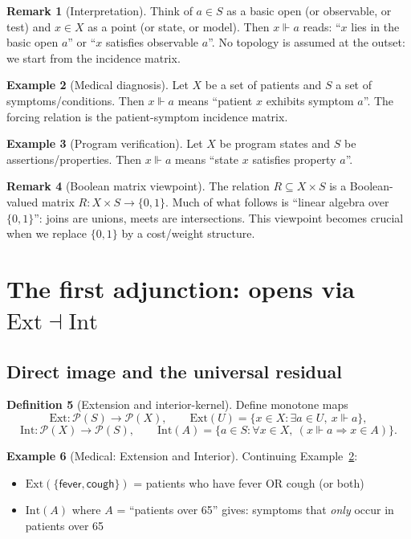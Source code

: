 \documentclass[11pt]{article}
\theoremstyle{definition}
\newtheorem{definition}{Definition}[section]
\newtheorem{remark}[definition]{Remark}
\newtheorem{example}[definition]{Example}
\theoremstyle{plain}
\newcommand{\Pow}{\mathcal P}
\newcommand{\Ext}{\mathrm{Ext}}
\newcommand{\Intt}{\mathrm{Int}}
\newcommand{\forces}{\Vdash}
\begin{document}
\begin{remark}[Interpretation]
Think of $a\in S$ as a basic open (or observable, or test) and $x\in X$ as a point (or state, or model).
Then $x\forces a$ reads: ``$x$ lies in the basic open $a$'' or ``$x$ satisfies observable $a$''.
No topology is assumed at the outset: we start from the incidence matrix.
\end{remark}

\begin{example}[Medical diagnosis]\label{ex:medical-forcing}
Let $X$ be a set of patients and $S$ a set of symptoms/conditions.
Then $x \forces a$ means ``patient $x$ exhibits symptom $a$''.
The forcing relation is the patient-symptom incidence matrix.
\end{example}

\begin{example}[Program verification]
Let $X$ be program states and $S$ be assertions/properties.
Then $x \forces a$ means ``state $x$ satisfies property $a$''.
\end{example}

\begin{remark}[Boolean matrix viewpoint]
The relation $R\subseteq X\times S$ is a Boolean-valued matrix
$R:X\times S\to \{0,1\}$.
Much of what follows is ``linear algebra over $\{0,1\}$'': joins are unions, meets are intersections.
This viewpoint becomes crucial when we replace $\{0,1\}$ by a cost/weight structure.
\end{remark}

\section{The first adjunction: opens via $\Ext \dashv \Intt$}\label{sec:adj1}

\subsection{Direct image and the universal residual}

\begin{definition}[Extension and interior-kernel]
Define monotone maps
\[
\Ext:\Pow(S)\to\Pow(X),\qquad \Ext(U)=\{x\in X:\exists a\in U,\ x\forces a\},
\]
\[
\Intt:\Pow(X)\to\Pow(S),\qquad \Intt(A)=\{a\in S:\forall x\in X,\ (x\forces a\Rightarrow x\in A)\}.
\]
\end{definition}

\begin{example}[Medical: Extension and Interior]
Continuing Example~\ref{ex:medical-forcing}:
\begin{itemize}
  \item $\Ext(\{\mathsf{fever}, \mathsf{cough}\})$ = patients who have fever OR cough (or both)
  \item $\Intt(A)$ where $A$ = ``patients over 65'' gives: symptoms that \emph{only} occur in patients over 65
\end{itemize}
\end{example}
\end{document}
